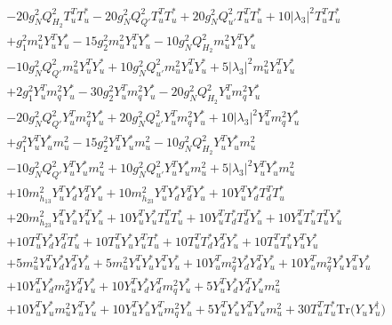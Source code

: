 {\begin{align}
 &-20 g_{N}^{2} Q_{H_2}^{2} {T_{u}^{T}  T_u^*} -20 g_{N}^{2} Q_{Q'}^{2} {T_{u}^{T}  T_u^*} +20 g_{N}^{2} Q_{u'}^{2} {T_{u}^{T}  T_u^*} +10 |\lambda_3|^2 {T_{u}^{T}  T_u^*} \nonumber \\ 
 &+g_{1}^{2} {m_u^2  Y_{u}^{T}  Y_u^*} -15 g_{2}^{2} {m_u^2  Y_{u}^{T}  Y_u^*} -10 g_{N}^{2} Q_{H_2}^{2} {m_u^2  Y_{u}^{T}  Y_u^*} \nonumber \\ 
 &-10 g_{N}^{2} Q_{Q'}^{2} {m_u^2  Y_{u}^{T}  Y_u^*} +10 g_{N}^{2} Q_{u'}^{2} {m_u^2  Y_{u}^{T}  Y_u^*} +5 |\lambda_3|^2 {m_u^2  Y_{u}^{T}  Y_u^*} \nonumber \\ 
 &+2 g_{1}^{2} {Y_{u}^{T}  m_q^2  Y_u^*} -30 g_{2}^{2} {Y_{u}^{T}  m_q^2  Y_u^*} -20 g_{N}^{2} Q_{H_2}^{2} {Y_{u}^{T}  m_q^2  Y_u^*} \nonumber \\ 
 &-20 g_{N}^{2} Q_{Q'}^{2} {Y_{u}^{T}  m_q^2  Y_u^*} +20 g_{N}^{2} Q_{u'}^{2} {Y_{u}^{T}  m_q^2  Y_u^*} +10 |\lambda_3|^2 {Y_{u}^{T}  m_q^2  Y_u^*} \nonumber \\ 
 &+g_{1}^{2} {Y_{u}^{T}  Y_u^*  m_u^2} -15 g_{2}^{2} {Y_{u}^{T}  Y_u^*  m_u^2} -10 g_{N}^{2} Q_{H_2}^{2} {Y_{u}^{T}  Y_u^*  m_u^2} \nonumber \\ 
 &-10 g_{N}^{2} Q_{Q'}^{2} {Y_{u}^{T}  Y_u^*  m_u^2} +10 g_{N}^{2} Q_{u'}^{2} {Y_{u}^{T}  Y_u^*  m_u^2} +5 |\lambda_3|^2 {Y_{u}^{T}  Y_u^*  m_u^2} \nonumber \\ 
 &+10 m_{h_{13}}^2 {Y_{u}^{T}  Y_d^*  Y_{d}^{T}  Y_u^*} +10 m_{h_{23}}^2 {Y_{u}^{T}  Y_d^*  Y_{d}^{T}  Y_u^*} +10 {Y_{u}^{T}  Y_d^*  T_{d}^{T}  T_u^*} \nonumber \\ 
 &+20 m_{h_{23}}^2 {Y_{u}^{T}  Y_u^*  Y_{u}^{T}  Y_u^*} +10 {Y_{u}^{T}  Y_u^*  T_{u}^{T}  T_u^*} +10 {Y_{u}^{T}  T_d^*  T_{d}^{T}  Y_u^*} +10 {Y_{u}^{T}  T_u^*  T_{u}^{T}  Y_u^*} \nonumber \\ 
 &+10 {T_{u}^{T}  Y_d^*  Y_{d}^{T}  T_u^*} +10 {T_{u}^{T}  Y_u^*  Y_{u}^{T}  T_u^*} +10 {T_{u}^{T}  T_d^*  Y_{d}^{T}  Y_u^*} +10 {T_{u}^{T}  T_u^*  Y_{u}^{T}  Y_u^*} \nonumber \\ 
 &+5 {m_u^2  Y_{u}^{T}  Y_d^*  Y_{d}^{T}  Y_u^*} +5 {m_u^2  Y_{u}^{T}  Y_u^*  Y_{u}^{T}  Y_u^*} +10 {Y_{u}^{T}  m_q^2  Y_d^*  Y_{d}^{T}  Y_u^*} +10 {Y_{u}^{T}  m_q^2  Y_u^*  Y_{u}^{T}  Y_u^*} \nonumber \\ 
 &+10 {Y_{u}^{T}  Y_d^*  m_d^2  Y_{d}^{T}  Y_u^*} +10 {Y_{u}^{T}  Y_d^*  Y_{d}^{T}  m_q^2  Y_u^*} +5 {Y_{u}^{T}  Y_d^*  Y_{d}^{T}  Y_u^*  m_u^2} \nonumber \\ 
 &+10 {Y_{u}^{T}  Y_u^*  m_u^2  Y_{u}^{T}  Y_u^*} +10 {Y_{u}^{T}  Y_u^*  Y_{u}^{T}  m_q^2  Y_u^*} +5 {Y_{u}^{T}  Y_u^*  Y_{u}^{T}  Y_u^*  m_u^2} +30 {T_{u}^{T}  T_u^*} \mbox{Tr}\Big({Y_u  Y_{u}^{\dagger}}\Big) \nonumber \\ 

\end{align}}
